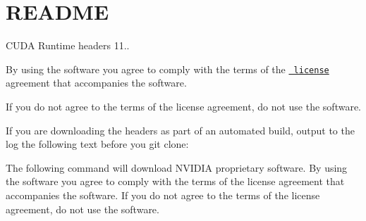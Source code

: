 \chapter{README}
\hypertarget{md__r_e_a_d_m_e}{}\label{md__r_e_a_d_m_e}
CUDA Runtime headers 11..

By using the software you agree to comply with the terms of the \href{https://gitlab.com/nvidia/headers/cuda/cudart/-/blob/main/LICENSE}{\texttt{ license}} agreement that accompanies the software.

If you do not agree to the terms of the license agreement, do not use the software.

If you are downloading the headers as part of an automated build, output to the log the following text before you \textquotesingle{}git clone\textquotesingle{}\+:

{\ttfamily The following command will download NVIDIA proprietary software. By using the software you agree to comply with the terms of the license agreement that accompanies the software. If you do not agree to the terms of the license agreement, do not use the software.} 